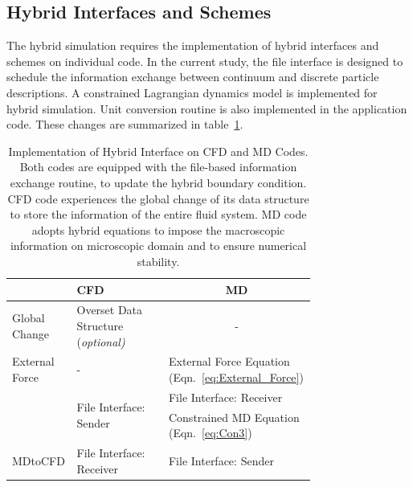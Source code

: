 \documentclass[preprint,12pt]{elsarticle}
\begin{document}
\subsection{Hybrid Interfaces and Schemes}
The hybrid simulation requires the implementation of hybrid interfaces and schemes on individual code. In the current study, the file interface is designed to schedule the information exchange between continuum and discrete particle descriptions.  A constrained Lagrangian dynamics model is implemented for hybrid simulation. Unit conversion routine is also implemented in the application code. These changes are summarized in table~\ref{table:interface_implementation}. 


\begin{table}
  \caption{\small Implementation of Hybrid Interface on CFD and MD Codes. Both codes are equipped with the file-based information exchange routine, to update the hybrid boundary condition. CFD code experiences the global change of its data structure to store the information of the entire fluid system. MD code adopts hybrid equations to impose the macroscopic information on microscopic domain and to ensure numerical stability.}
  \label{table:interface_implementation}
  \centering
\footnotesize
 \begin{tabular}{>{\centering}p{0.15\linewidth} || p{0.3\linewidth} | p{0.3\linewidth} }
\hline
  & \centering CFD & \multicolumn{1}{c}{MD} \\
\hline
 Global Change & Overset Data Structure (\it{optional}) & \multicolumn{1}{c}{-} \\
\hline
 \centering External Force & \centering - & External Force Equation (Eqn.~\ref{eq:External_Force}) \\
\hline
 \multirow{2}{*}{CFDtoMD} &  \multirow{2}{*}{File Interface: Sender} & {File Interface: Receiver} \\
 & & Constrained MD Equation (Eqn.~\ref{eq:Con3}) \\
\hline
 MDtoCFD & File Interface: Receiver & File Interface: Sender \\
\hline
\end{tabular} %
\vspace{-1em}
\end{table}
\end{document}
